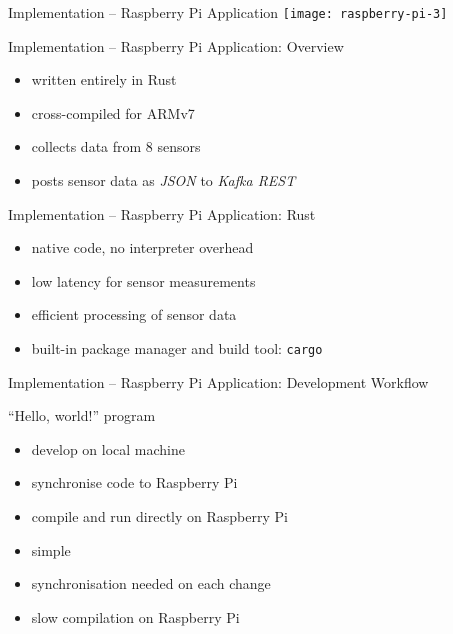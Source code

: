 \begin{frame}{Implementation -- Raspberry Pi Application}
 \centering
 \vspace*{1em}
 \texttt{[image: raspberry-pi-3]}
\end{frame}

\begin{frame}{Implementation -- Raspberry Pi Application: Overview}
  \begin{itemize}
    \item written entirely in Rust
    \item cross-compiled for ARMv7
    \item collects data from 8 sensors
    \item posts sensor data as \textit{JSON} to \textit{Kafka REST}
  \end{itemize}
\end{frame}

\begin{frame}{Implementation -- Raspberry Pi Application: Rust}
  \begin{itemize}
    \item native code, no interpreter overhead
    \item low latency for sensor measurements
    \item efficient processing of sensor data
    \item built-in package manager and build tool: \texttt{cargo}
  \end{itemize}
\end{frame}

\begin{frame}{Implementation -- Raspberry Pi Application: Development Workflow}
  \begin{block}{“Hello, world!” program}
    \begin{itemize}
      \item develop on local machine
      \item synchronise code to Raspberry Pi
      \item compile and run directly on Raspberry Pi
    \end{itemize}
  \end{block}
  \begin{block}{}
    \begin{itemize}
      \item simple
    \end{itemize}
  \end{block}
  \begin{block}{}
    \begin{itemize}
      \item synchronisation needed on each change
      \item slow compilation on Raspberry Pi
    \end{itemize}
  \end{block}
\end{frame}


